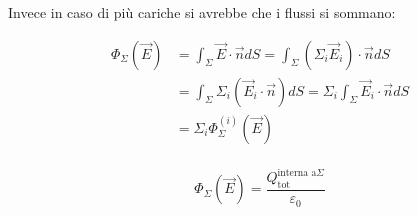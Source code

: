 Invece in caso di più cariche si avrebbe che i flussi si sommano:

\begin{align*}
	\Phi_{\Sigma}(\vec{E}) &=\int_{\Sigma}\vec{E}\cdot \vec{n} dS= \int_{\Sigma}(\Sigma_i\vec{E}_i)\cdot \vec{n} dS  \\
	&= \int_{\Sigma} \Sigma_i(\vec{E}_i\cdot \vec{n}  )dS= \Sigma_i \int_{\Sigma} \vec{E}_i\cdot \vec{n} dS \\
	&= \Sigma_i\Phi_{\Sigma}^{(i)}(\vec{E} )  \\
\end{align*}

\[
	\boxed{\Phi_{\Sigma}(\vec{E} )=\frac{Q_{\text{tot}}^{\text{interna a} \Sigma}}{\varepsilon_0}}
\]

\begin{figure}[htpb]
	\centering


	\begin{tikzpicture}[x=0.75pt,y=0.75pt,yscale=-1,xscale=1]


\end{tikzpicture}
\end{figure}
